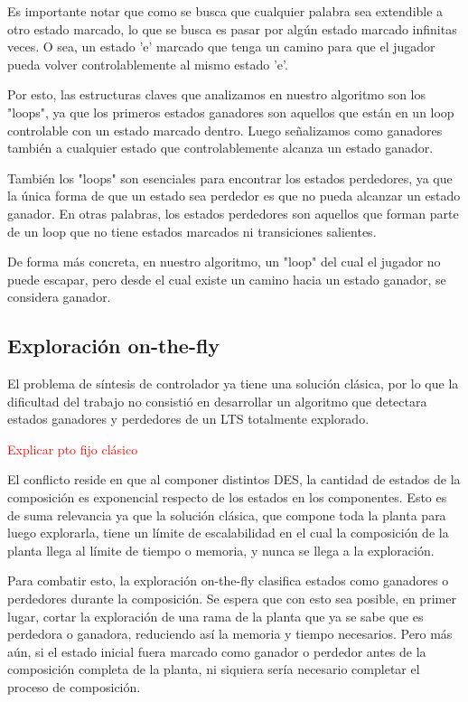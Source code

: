 Es importante notar que como se busca que cualquier palabra sea extendible a otro estado marcado, lo que se busca es pasar por algún estado marcado infinitas veces. O sea, un estado 'e' marcado que tenga un camino para que el jugador pueda volver controlablemente al mismo estado 'e'.

Por esto, las estructuras claves que analizamos en nuestro algoritmo son los "loops", ya que los primeros estados ganadores son aquellos que están en un loop controlable con un estado marcado dentro. Luego señalizamos como ganadores también a cualquier estado que controlablemente alcanza un estado ganador.

También los "loops" son esenciales para encontrar los estados perdedores, ya que la única forma de que un estado sea perdedor es que no pueda alcanzar un estado ganador. En otras palabras, los estados perdedores son aquellos que forman parte de un loop que no tiene estados marcados ni transiciones salientes.

De forma más concreta, en nuestro algoritmo, un "loop" del cual el jugador no puede escapar, pero desde el cual existe un camino hacia un estado ganador, se considera ganador.


\subsection{Exploración on-the-fly}

El problema de síntesis de controlador ya tiene una solución clásica, por lo que la dificultad del trabajo no consistió en desarrollar un algoritmo que detectara estados ganadores y perdedores de un LTS totalmente explorado. 

\textcolor{red}{Explicar pto fijo clásico}

El conflicto reside en que al componer distintos DES, la cantidad de estados de la composición es exponencial respecto de los estados en los componentes. Esto es de suma relevancia ya que la solución clásica, que compone toda la planta para luego explorarla, tiene un límite de escalabilidad en el cual la composición de la planta llega al límite de tiempo o memoria, y nunca se llega a la exploración.

Para combatir esto, la exploración on-the-fly clasifica estados como ganadores o perdedores durante la composición. Se espera que con esto sea posible, en primer lugar, cortar la exploración de una rama de la planta que ya se sabe que es perdedora o ganadora, reduciendo así la memoria y tiempo necesarios. Pero más aún, si el estado inicial fuera marcado como ganador o perdedor antes de la composición completa de la planta, ni siquiera sería necesario completar el proceso de composición.

